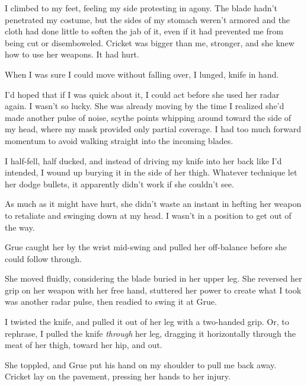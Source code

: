 I climbed to my feet, feeling my side protesting in agony.  The blade hadn't penetrated my costume, but the sides of my stomach weren't armored and the cloth had done little to soften the jab of it, even if it had prevented me from being cut or disemboweled.  Cricket was bigger than me, stronger, and she knew how to use her weapons.  It had hurt.



When I was sure I could move without falling over, I lunged, knife in hand.



I'd hoped that if I was quick about it, I could act before she used her radar again.  I wasn't so lucky.  She was already moving by the time I realized she'd made another pulse of noise, scythe points whipping around toward the side of my head, where my mask provided only partial coverage.  I had too much forward momentum to avoid walking straight into the incoming blades.



I half-fell, half ducked, and instead of driving my knife into her back like I'd intended, I wound up burying it in the side of her thigh.  Whatever technique let her dodge bullets, it apparently didn't work if she couldn't see.



As much as it might have hurt, she didn't waste an instant in hefting her weapon to retaliate and swinging down at my head.  I wasn't in a position to get out of the way.



Grue caught her by the wrist mid-swing and pulled her off-balance before she could follow through.



She moved fluidly, considering the blade buried in her upper leg.  She reversed her grip on her weapon with her free hand, stuttered her power to create what I took was another radar pulse, then readied to swing it at Grue.



I twisted the knife, and pulled it out of her leg with a two-handed grip.  Or, to rephrase, I pulled the knife \emph{through} her leg, dragging it horizontally through the meat of her thigh, toward her hip, and out.



She toppled, and Grue put his hand on my shoulder to pull me back away.  Cricket lay on the pavement, pressing her hands to her injury.



